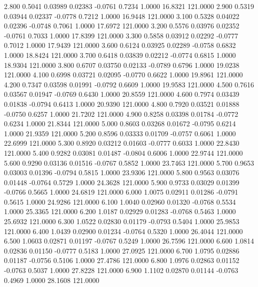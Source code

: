    2.800   0.5041   0.03989   0.02383  -0.0761   0.7234   1.0000  16.8321 121.0000
   2.900   0.5319   0.03944   0.02337  -0.0778   0.7212   1.0000  16.9448 121.0000
   3.100   0.5328   0.04022   0.02396  -0.0748   0.7061   1.0000  17.6972 121.0000
   3.200   0.5576   0.03976   0.02352  -0.0761   0.7033   1.0000  17.8399 121.0000
   3.300   0.5858   0.03912   0.02292  -0.0777   0.7012   1.0000  17.9439 121.0000
   3.600   0.6124   0.03925   0.02289  -0.0758   0.6832   1.0000  18.8424 121.0000
   3.700   0.6418   0.03839   0.02212  -0.0774   0.6815   1.0000  18.9304 121.0000
   3.800   0.6707   0.03750   0.02133  -0.0789   0.6796   1.0000  19.0238 121.0000
   4.100   0.6998   0.03721   0.02095  -0.0770   0.6622   1.0000  19.8961 121.0000
   4.200   0.7347   0.03598   0.01991  -0.0792   0.6609   1.0000  19.9583 121.0000
   4.500   0.7616   0.03567   0.01947  -0.0769   0.6430   1.0000  20.8559 121.0000
   4.600   0.7974   0.03439   0.01838  -0.0794   0.6413   1.0000  20.9390 121.0000
   4.800   0.7920   0.03521   0.01888  -0.0750   0.6257   1.0000  21.7202 121.0000
   4.900   0.8258   0.03398   0.01784  -0.0772   0.6234   1.0000  21.8344 121.0000
   5.000   0.8603   0.03268   0.01672  -0.0795   0.6214   1.0000  21.9359 121.0000
   5.200   0.8596   0.03333   0.01709  -0.0757   0.6061   1.0000  22.6999 121.0000
   5.300   0.8920   0.03212   0.01603  -0.0777   0.6033   1.0000  22.8430 121.0000
   5.400   0.9282   0.03081   0.01487  -0.0804   0.6006   1.0000  22.9744 121.0000
   5.600   0.9290   0.03136   0.01516  -0.0767   0.5852   1.0000  23.7463 121.0000
   5.700   0.9653   0.03003   0.01396  -0.0794   0.5815   1.0000  23.9306 121.0000
   5.800   0.9563   0.03076   0.01448  -0.0764   0.5729   1.0000  24.3628 121.0000
   5.900   0.9733   0.03029   0.01399  -0.0766   0.5665   1.0000  24.6819 121.0000
   6.000   1.0075   0.02911   0.01286  -0.0791   0.5615   1.0000  24.9286 121.0000
   6.100   1.0040   0.02960   0.01320  -0.0768   0.5534   1.0000  25.3365 121.0000
   6.200   1.0187   0.02929   0.01283  -0.0768   0.5463   1.0000  25.6932 121.0000
   6.300   1.0522   0.02830   0.01179  -0.0793   0.5404   1.0000  25.9853 121.0000
   6.400   1.0439   0.02900   0.01234  -0.0764   0.5320   1.0000  26.4044 121.0000
   6.500   1.0603   0.02871   0.01197  -0.0767   0.5249   1.0000  26.7596 121.0000
   6.600   1.0814   0.02836   0.01150  -0.0777   0.5183   1.0000  27.0925 121.0000
   6.700   1.0795   0.02886   0.01187  -0.0756   0.5106   1.0000  27.4786 121.0000
   6.800   1.0976   0.02863   0.01152  -0.0763   0.5037   1.0000  27.8228 121.0000
   6.900   1.1102   0.02870   0.01144  -0.0763   0.4969   1.0000  28.1608 121.0000
